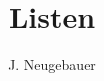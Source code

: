 \documentclass[10pt, a4paper]{scrartcl}
\author{J. Neugebauer}
\title{Listen}
\date{\Heute}
\begin{document}
\ReiheTitel
\end{document}
